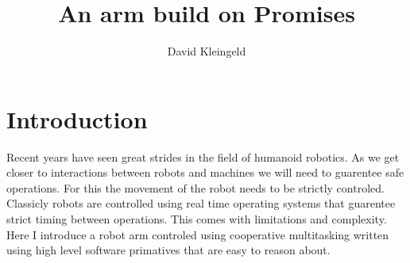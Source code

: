 \documentclass[lang=en, hanging-titles=true]{skrapport}
\title{An arm build on Promises}
\author[dskleingeld@gmail.com]{David Kleingeld}
\begin{document}
\maketitle
\tableofcontents

\section{Introduction}
Recent years have seen great strides in the field of humanoid robotics. As we get closer to interactions between robots and machines we will need to guarentee safe operations. For this the movement of the robot needs to be strictly controled. Classicly robots are controlled using real time operating systems that guarentee strict timing between operations. This comes with limitations and complexity. Here I introduce a robot arm controled using cooperative multitasking written using high level software primatives that are easy to reason about.

%
%
%
%
%

\clearpage
\appendix

\end{document}
